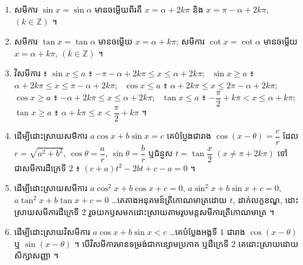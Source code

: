 \begin{note}[មេរៀនសង្ខេប]
\begin{enumerate}[1]
  \item សមីការ $\sin x = \sin\alpha$ មានចម្លើយពីរគឺ $x = \alpha + 2k\pi$ និង $x = \pi - \alpha + 2k\pi$, $(k \in \mathbb{Z})$ ។
  \item សមីការ $\tan x = \tan\alpha$ មានចម្លើយ $x = \alpha + k\pi$; សមីការ $\cot x = \cot\alpha$ មានចម្លើយ $x = \alpha + k\pi$, $(k \in \mathbb{Z})$ ។
  \item វិសមីការ ៖ $\sin x \le a$ ៖ $-\pi - \alpha + 2k\pi \le x \le \alpha + 2k\pi$; \ $\sin x \ge a$ ៖ $\alpha + 2k\pi \le x \le \pi - \alpha + 2k\pi$; \ $\cos x \le a$ ៖ $\alpha + 2k\pi \le x \le 2\pi - \alpha + 2k\pi$; \ $\cos x \ge a$ ៖ $-\alpha + 2k\pi \le x \le \alpha + 2k\pi$; \ $\tan x \le a$ ៖ $-\dfrac{\pi}{2} + k\pi < x \le \alpha + k\pi$; \ $\tan x \ge a$ ៖ $\alpha + k\pi \le x < \dfrac{\pi}{2} + k\pi$ ។
  \item ដើម្បីដោះស្រាយសមីការ $a\cos x + b\sin x = c$ គេបំប្លែងជារាង $\cos(x - \theta) = \dfrac{c}{r}$ ដែល $r = \sqrt{a^2 + b^2}$, $\cos\theta = \dfrac{a}{r}$, $\sin\theta = \dfrac{b}{r}$ ឬជំនួស $t = \tan\dfrac{x}{2}$ $(x \ne \pi + 2k\pi)$ ទៅជាសមីការដឺក្រេទី $2$ ៖ $(c + a)t^2 - 2bt + c - a = 0$ ។
  \item ដើម្បីដោះស្រាយសមីការ $a\cos^2 x + b\cos x + c = 0$, $a\sin^2 x + b\sin x + c = 0$, $a\tan^2 x + b\tan x + c = 0$ \ldots គេតាងអនុគមន៍ត្រីកោណមាត្រដោយ $t$, ដាក់លក្ខខណ្ឌ, ដោះស្រាយសមីការដឺក្រេទី $2$ រួចយកឫសមកដោះស្រាយតាមរូបមន្តសមីការត្រីកោណមាត្រ ។
  \item ដើម្បីដោះស្រាយវិសមីការ $a\cos x + b\sin x < c$ \ldots គេបំប្លែងអង្គទី $1$ ជារាង $\cos(x - \theta)$ ឬ $\sin(x - \theta)$ ។ បើវិសមីការមានទម្រង់ជាកន្សោមប្រភាគ ឬដឺក្រេទី $2$ គេដោះស្រាយដោយសិក្សាសញ្ញា ។
\end{enumerate}
\end{note}

